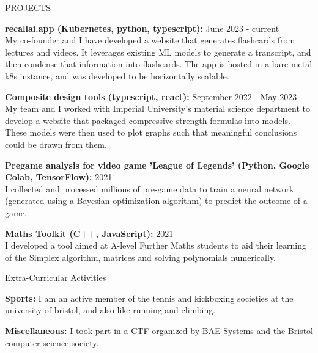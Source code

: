 \documentclass{resume} %
\begin{document}
\begin{rSection}{PROJECTS}
\vspace{-1.25em}

\item \textbf{recallai.app (Kubernetes, python, typescript):} \hfill June 2023 - current \\
{My co-founder and I have developed a website that generates flashcards from lectures and videos. It leverages existing ML models to generate a transcript, and then condense that information into flashcards. The app is hosted in a bare-metal k8s instance, and was developed to be horizontally scalable.}

\item \textbf{Composite design tools (typescript, react):} \hfill September 2022 - May 2023 \\
{My team and I worked with Imperial University's material science department to develop a website that packaged compressive strength formulas into models. These models were then used to plot graphs such that meaningful conclusions could be drawn from them.}

\item \textbf{Pregame analysis for video game 'League of Legends' (Python, Google Colab, TensorFlow):} \hfill 2021 \\
{I collected and processed millions of pre-game data to train a neural network (generated using a Bayesian optimization algorithm) to predict the outcome of a game.}%

\item \textbf{Maths Toolkit (C++, JavaScript):} \hfill 2021 \\
{I developed a tool aimed at A-level Further Maths students to aid their learning of the Simplex algorithm, matrices and solving polynomials numerically.}

\end{rSection}

\begin{rSection}{Extra-Curricular Activities} 
\vspace{-1.25em}

\item{\textbf{Sports:}}
I am an active member of the tennis and kickboxing societies at the university of bristol, and also like running and climbing. \\

\vspace{-1.25em}

\item{\textbf{Miscellaneous:}}
I took part in a CTF organized by BAE Systems and the Bristol computer science society. \\

\end{rSection}
\end{document}
